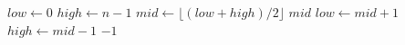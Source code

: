 \documentclass{article}
\begin{document}
\begin{algorithm}
\caption{Noend Pseudocode}\label{alg:noend}
\begin{algorithmic}[1]
  \State $low \gets 0$
  \State $high \gets n - 1$
    \State $mid \gets \lfloor (low + high) / 2 \rfloor$
      \State \Return $mid$
      \State $low \gets mid + 1$
    \Else
      \State $high \gets mid - 1$
    \EndIf
  \EndWhile
  \State \Return $-1$
\EndProcedure
\end{algorithmic}
\end{algorithm}
\end{document}
